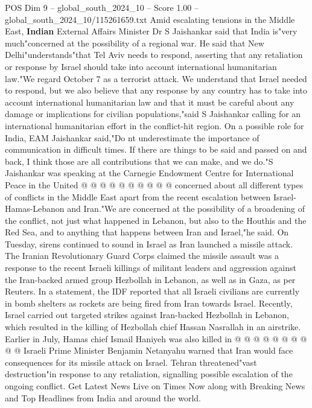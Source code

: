 \begin{textsample}{POS Dim 9 – global\_south\_2024\_10 – Score 1.00 – global\_south\_2024\_10/115261659.txt}  \label{ex:f9_pos_173}
Amid escalating tensions in the Middle East, \textbf{Indian} External Affairs Minister Dr S Jaishankar said that India is"very much"concerned at the possibility of a regional war.
He said that New Delhi"understands"that Tel Aviv needs to respond, asserting that any retaliation or response by Israel should take into account international humanitarian law."We regard October 7 as a terrorist attack.
We understand that Israel needed to respond, but we also believe that any response by any country has to take into account international humanitarian law and that it must be careful about any damage or implications for civilian populations,"said S Jaishankar calling for an international humanitarian effort in the conflict-hit region.
On a possible role for India, EAM Jaishankar said,"Do nt underestimate the importance of communication in difficult times.
If there are things to be said and passed on and back, I think those are all contributions that we can make, and we do."S Jaishankar was speaking at the Carnegie Endowment Centre for International Peace in the United @ @ @ @ @ @ @ @ @ @ concerned about all different types of conflicts in the Middle East apart from the recent escalation between Israel-Hamas-Lebanon and Iran."We are concerned at the possibility of a broadening of the conflict, not just what happened in Lebanon, but also to the Houthis and the Red Sea, and to anything that happens between Iran and Israel,"he said.
On Tuesday, sirens continued to sound in Israel as Iran launched a missile attack.
The Iranian Revolutionary Guard Corps claimed the missile assault was a response to the recent Israeli killings of militant leaders and aggression against the Iran-backed armed group Hezbollah in Lebanon, as well as in Gaza, as per Reuters.
In a statement, the IDF reported that all Israeli civilians are currently in bomb shelters as rockets are being fired from Iran towards Israel.
Recently, Israel carried out targeted strikes against Iran-backed Hezbollah in Lebanon, which resulted in the killing of Hezbollah chief Hassan Nasrallah in an airstrike.
Earlier in July, Hamas chief Ismail Haniyeh was also killed in @ @ @ @ @ @ @ @ @ @ Israeli Prime Minister Benjamin Netanyahu warned that Iran would face consequences for its missile attack on Israel.
Tehran threatened"vast destruction"in response to any retaliation, signalling possible escalation of the ongoing conflict.
Get Latest News Live on Times Now along with Breaking News and Top Headlines from India and around the world.

\end{textsample}
